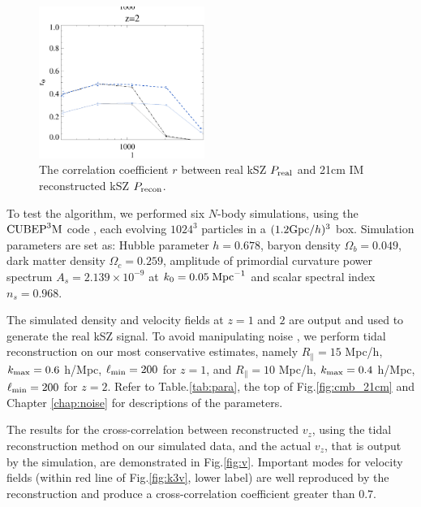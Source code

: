 \begin{figure}[tbp]
\begin{center}
\includegraphics[width=0.48\textwidth]{figure/cl_correlation_z1_z2.eps}
\end{center}
\vspace{-0.7cm}
\caption{The correlation coefficient $r$ between real kSZ $P_\mathrm{real}$ 
and 21cm IM reconstructed kSZ $P_\mathrm{recon}$. 
}
\label{fig:r}
\end{figure}
\label{ssec:tide}

To test the algorithm, we performed six $N$-body simulations, using the $\mathrm{CUBEP}^3\mathrm{M}$ code \cite{2013:code}, each evolving $1024^3$ particles in a $(1.2\mathrm{Gpc}/h)^3$ box. Simulation parameters are set as: Hubble parameter $h=0.678$, baryon density $\Omega_{b}=0.049$, dark matter density $\Omega_{c}=0.259$, amplitude of primordial curvature power spectrum $A_s=2.139\times10^{-9}$ at $k_0=0.05\;\mathrm{Mpc}^{-1}$ and scalar spectral index $n_s=0.968$.

The simulated density and velocity fields at $z=1$ and $2$ are output 
and used to generate the real kSZ signal. To avoid manipulating noise , we perform tidal reconstruction on our most conservative estimates, namely $R_\parallel=15$ Mpc/h, $k_\mathrm{max}=0.6$ h/Mpc, $\ell_\mathrm{min}=200$ for $z=1$, and $R_\parallel=10$ Mpc/h, $k_\mathrm{max}=0.4$ h/Mpc, $\ell_\mathrm{min}=200$ for $z=2$. Refer to Table.\ref{tab:para}, the top of Fig.\ref{fig:cmb_21cm} and Chapter \ref{chap:noise}  for descriptions of the parameters.  

The results for the cross-correlation between reconstructed $v_z$, using the tidal reconstruction method on our simulated data, and the actual $v_z$, that is output by the simulation, are demonstrated in Fig.\ref{fig:v}. Important modes for velocity fields (within red line of Fig.\ref{fig:k3v}, lower label) are well reproduced by the reconstruction and produce a cross-correlation coefficient greater than $0.7$. 

